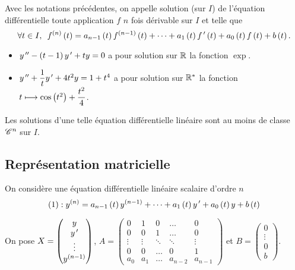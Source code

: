 \begin{defi}
Avec les notations précédentes, on appelle solution (sur \(I\)) de l'équation différentielle toute application \(f\) \(n\) fois dérivable sur \(I\) et telle que \[\quantifs{\forall t\in I}f\deriv{n}\paren{t}=a_{n-1}\paren{t}f\deriv{n-1}\paren{t}+\dots+a_1\paren{t}f\prim\paren{t}+a_0\paren{t}f\paren{t}+b\paren{t}.\]
\end{defi}

\begin{ex}
\begin{itemize}
    \item \(y^{\,\prime\prime}-\left(t-1\right)y^{\,\prime}+ty=0\) a pour solution sur \(\mathbb{R}\) la fonction \(\exp\). \\
    \item \(y^{\,\prime\prime}+\dfrac{1}{t}y^{\,\prime}+4t^2y=1+t^4\) a pour solution sur \(\mathbb{R}^*\) la fonction \(t\longmapsto\cos\left(t^2\right)+\dfrac{t^2}{4}\).
\end{itemize}
\end{ex}

\begin{prop}
Les solutions d'une telle équation différentielle linéaire sont au moins de classe \(\mathscr{C}^{n}\) sur \(I\).
\end{prop}

\subsection{Représentation matricielle}

On considère une équation différentielle linéaire scalaire d'ordre \(n\) \[\left(1\right):y^{\left(n\right)}=a_{n-1}\left(t\right)y^{\left(n-1\right)}+\dots+a_1\left(t\right)y^{\,\prime}+a_0\left(t\right)y+b\left(t\right)\]

On pose \(X=\begin{pmatrix}
y \\
y^{\,\prime} \\
\vdots \\
y^{\left(n-1\right)}
\end{pmatrix}\), \(A=\begin{pmatrix}
0 & 1 & 0 & \dots & 0 \\
0 & 0 & 1 & \dots & 0 \\
\vdots & \vdots & \ddots & \ddots & \vdots \\
0 & 0 & \dots & 0 & 1 \\
a_0 & a_1 & \dots & a_{n-2} & a_{n-1}
\end{pmatrix}\) et \(B=\begin{pmatrix}
0 \\
\vdots \\
0 \\
b
\end{pmatrix}\).

